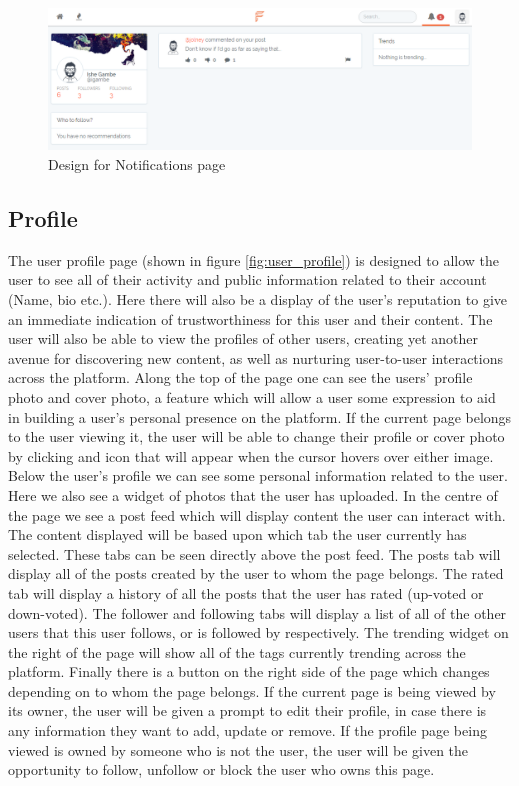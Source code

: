 \begin{figure}[H]
\centering
\includegraphics[width=1\linewidth]{Images/Design/notifications-page}
\caption{Design for Notifications page}
\label{fig:notifications-page}
\end{figure}

\subsection{Profile}
The user profile page (shown in figure \ref{fig:user_profile}) is designed to allow the user to see all of their activity and public information related to their account (Name, bio etc.). Here there will also be a display of the user's reputation to give an immediate indication of trustworthiness for this user and their content. The user will also be able to view the profiles of other users, creating yet another avenue for discovering new content, as well as nurturing user-to-user interactions across the platform. Along the top of the page one can see the users' profile photo and cover photo, a feature which will allow a user some expression to aid in building a user's personal presence on the platform. If the current page belongs to the user viewing it, the user will be able to change their profile or cover photo by clicking and icon that will appear when the cursor hovers over either image. Below the user's profile we can see some personal information related to the user. Here we also see a widget of photos that the user has uploaded. In the centre of the page we see a post feed which will display content the user can interact with. The content displayed will be based upon which tab the user currently has selected. These tabs can be seen directly above the post feed. The posts tab will display all of the posts created by the user to whom the page belongs. The rated tab will display a history of all the posts that the user has rated (up-voted or down-voted). The follower and following tabs will display a list of all of the other users that this user follows, or is followed by respectively. The trending widget on the right of the page will show all of the tags currently trending across the platform. Finally there is a button on the right side of the page which changes depending on to whom the page belongs. If the current page is being viewed by its owner, the user will be given a prompt to edit their profile, in case there is any information they want to add, update or remove. If the profile page being viewed is owned by someone who is not the user, the user will be given the opportunity to follow, unfollow or block the user who owns this page.

